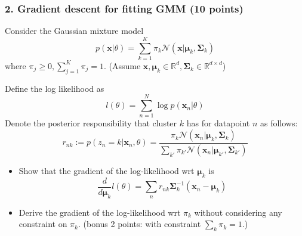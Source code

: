\documentclass[12pt]{article}%
\begin{document}
\subsubsection*{2. Gradient descent for fitting GMM (10 points)}
Consider the Gaussian mixture model
\[p(\mathbf{x}|\theta)=\sum_{k=1}^K \pi_k \mathcal{N}(\mathbf{x}|\boldsymbol{\mu}_k,\boldsymbol{\Sigma}_k)\]
where $\pi_j\geq 0, \sum_{j=1}^K\pi_j = 1$. (Assume $\mathbf{x},\boldsymbol{\mu}_k\in \mathbb{R}^d,\boldsymbol{\Sigma}_k\in \mathbb{R}^{d\times d}$)

Define the log likelihood as
\[ l(\theta) = \sum_{n=1}^N \log p(\mathbf{x}_n|\theta)
\]
Denote the posterior responsibility that cluster $k$ has for datapoint $n$ as follows:
\[
r_{nk}:=p(z_n=k|\mathbf{x}_n,\theta) = \frac{\pi_k\mathcal{N}(\mathbf{x}_n|\boldsymbol{\mu}_k,\boldsymbol{\Sigma}_k)}{\sum_{k'}\pi_{k'}\mathcal{N}(\mathbf{x}_n|\boldsymbol{\mu}_{k'},\boldsymbol{\Sigma}_{k'})}
\]
\begin{itemize}
	
	\item Show that the gradient of the log-likelihood wrt $\boldsymbol{\mu}_k$ is
	\[ \frac{d}{d\boldsymbol{\mu}_k}l(\theta) = \sum_n r_{nk}\boldsymbol{\Sigma}_k^{-1}(\mathbf{x}_n-\boldsymbol{\mu}_k)
	\]
    \item Derive the gradient of the log-likelihood wrt $\pi_k$ without considering any constraint on $\pi_k$. (bonus 2 points: with constraint $\sum_k\pi_k=1$.)
	
\end{itemize}
\end{document}
